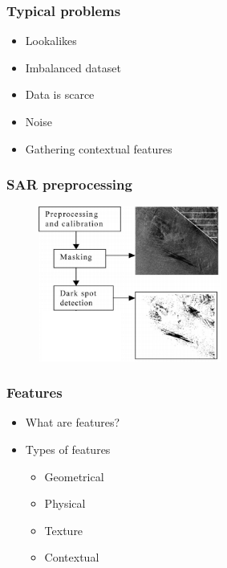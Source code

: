 \documentclass{beamer}
\begin{document}
\begin{frame}
\frametitle{Typical problems}
\begin{itemize}
	\item Lookalikes
	\item Imbalanced dataset
	\item Data is scarce
	\item Noise
	\item Gathering contextual features
	
\end{itemize}
\end{frame}



\begin{frame}
\frametitle{SAR preprocessing}
\begin{figure}
	\centering
    \includegraphics[width=60mm,scale=1]{./img/preprocessing_diagram.png}
\end{figure}
\end{frame}


\begin{frame}
\frametitle{Features}
\begin{itemize}
	\item What are features?
	\item Types of features \begin{itemize}
					\item Geometrical %
					\item Physical %
					\item Texture %
					\item Contextual  %
					\end{itemize}
				
\end{itemize}

\end{frame}
\end{document}
